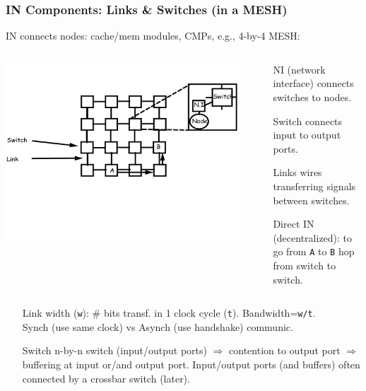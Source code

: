 \documentclass{beamer}
\newcommand{\emp}[1]{\textcolor{DikuRed}{ #1}}
\begin{document}
\begin{frame}[fragile,t]
\frametitle{IN Components: Links \& Switches (in a MESH)}

IN connects nodes: cache/mem modules, CMPs, e.g., 4-by-4 MESH:
\vspace{-3ex}

\begin{columns}
\includegraphics[width=47ex]{Figures/FigsInterconnect/Mesh}\pause
{}
\vspace{-6ex}
\begin{scriptsize}
\begin{itemize}
    \item[NI] (network interface) connects switches to nodes.
    \item[Switch] connects input to output ports.
    \item[Links] wires transferring signals between switches.
    \item[Direct] IN (decentralized): to go from {\tt A} to {\tt B} hop from switch to switch.
\end  {itemize}
\end{scriptsize}
\end{columns}
\vspace{-7ex}

\begin{itemize}
    \item[Link] \emp{width ({\tt w})}: \# bits transf. in 1 clock cycle ({\tt t}).
                \emp{Bandwidth={\tt w/t}}.\\
                \emp{Synch} (use same clock) vs \emp{Asynch} (use handshake) \emp{communic}.\medskip
    \item[Switch] n-by-n switch (input/output ports) $\Rightarrow$ contention to output port
                    $\Rightarrow$ buffering at input or/and output port.
                  Input/output ports (and buffers) often connected by a crossbar switch (later).
\end  {itemize}


\end{frame}
\end{document}
